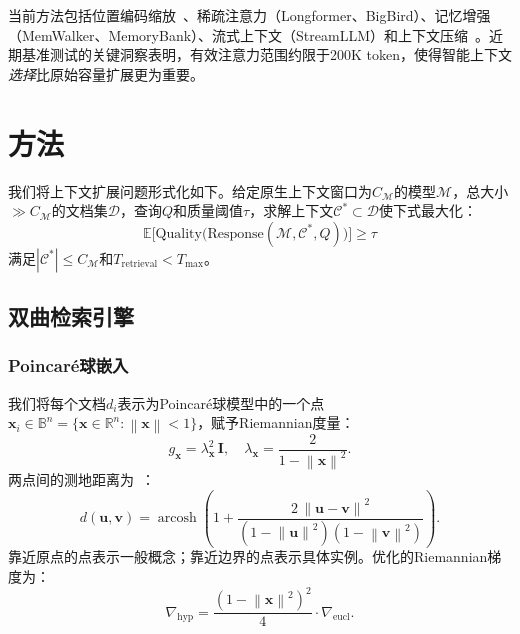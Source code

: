 \documentclass[a4paper,11pt]{ctexart}
\newcommand{\R}{\mathbb{R}}
\newcommand{\B}{\mathbb{B}}
\newcommand{\norm}[1]{\left\|#1\right\|}
\begin{document}
当前方法包括位置编码缩放~\cite{peng2024yarn}、稀疏注意力（Longformer、BigBird）、记忆增强（MemWalker、MemoryBank）、流式上下文（StreamLLM）和上下文压缩~\cite{jiang2024longllmlingua,li2026ata,su2025enhancingrag}。近期基准测试的关键洞察表明，有效注意力范围约限于200K token，使得智能上下文\emph{选择}比原始容量扩展更为重要。


\section{方法}
\label{sec:method}

我们将上下文扩展问题形式化如下。给定原生上下文窗口为$C_{\mathcal{M}}$的模型$\mathcal{M}$，总大小$\gg C_{\mathcal{M}}$的文档集$\mathcal{D}$，查询$Q$和质量阈值$\tau$，求解上下文$\mathcal{C}^{*} \subset \mathcal{D}$使下式最大化：
\begin{equation}
  \mathbb{E}\!\bigl[\mathrm{Quality}\bigl(\mathrm{Response}(\mathcal{M},
    \mathcal{C}^{*}, Q)\bigr)\bigr] \geq \tau
  \label{eq:objective}
\end{equation}
满足$|\mathcal{C}^{*}| \leq C_{\mathcal{M}}$和$T_{\mathrm{retrieval}} < T_{\max}$。

\subsection{双曲检索引擎}
\label{sec:hyperbolic}

\subsubsection{Poincar\'{e}球嵌入}

我们将每个文档$d_i$表示为Poincar\'{e}球模型中的一个点$\mathbf{x}_i \in \B^n = \{\mathbf{x} \in \R^n : \norm{\mathbf{x}} < 1\}$，赋予Riemannian度量：
\begin{equation}
  g_{\mathbf{x}} = \lambda_{\mathbf{x}}^{2}\,\mathbf{I}, \quad
  \lambda_{\mathbf{x}} = \frac{2}{1 - \norm{\mathbf{x}}^{2}}.
  \label{eq:conformal}
\end{equation}
两点间的测地距离为~\cite{nickel2017poincare}：
\begin{equation}
  d(\mathbf{u}, \mathbf{v}) =
    \operatorname{arcosh}\!\left(
      1 + \frac{2\,\norm{\mathbf{u} - \mathbf{v}}^{2}}
               {(1 - \norm{\mathbf{u}}^{2})(1 - \norm{\mathbf{v}}^{2})}
    \right).
  \label{eq:poincare-dist}
\end{equation}
靠近原点的点表示一般概念；靠近边界的点表示具体实例。优化的Riemannian梯度为：
\begin{equation}
  \nabla_{\mathrm{hyp}} =
    \frac{(1 - \norm{\mathbf{x}}^{2})^{2}}{4}
    \cdot \nabla_{\mathrm{eucl}}.
  \label{eq:riemannian-grad}
\end{equation}
\end{document}
